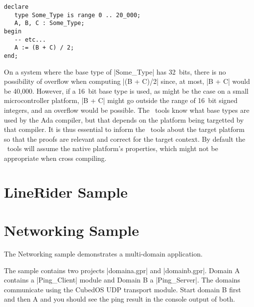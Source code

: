 \begin{lstlisting}
declare
   type Some_Type is range 0 .. 20_000;
   A, B, C : Some_Type;
begin
   -- etc...
   A := (B + C) / 2;
end;
\end{lstlisting}

On a system where the base type of |Some_Type| has 32~bits, there is no possibility of overflow
when computing |(B + C)/2| since, at most, |B + C| would be 40,000. However, if a 16~bit base
type is used, as might be the case on a small microcontroller platform, |B + C| might go outside
the range of 16~bit signed integers, and an overflow would be possible. The \SPARK\ tools know
what base types are used by the Ada compiler, but that depends on the platform being targetted
by that compiler. It is thus essential to inform the \SPARK\ tools about the target platform so
that the proofs are relevant and correct for the target context. By default the \SPARK\ tools
will assume the native platform's properties, which might not be appropriate when cross
compiling.


\section{LineRider Sample}
\label{sec:linerider-sample}


\section{Networking Sample}
\label{sec:linerider-sample}

The Networking sample demonstrates a multi-domain application.

The sample contains two projects |domaina.gpr| and |domainb.gpr|. Domain A contains a |Ping_Client| module and Domain B a |Ping_Server|. The domains communicate using the CubedOS UDP transport module. Start domain B first and then A and you should see the ping result in the console output of both.
